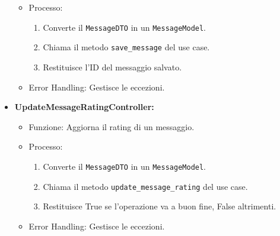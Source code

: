 \begin{itemize}
\begin{itemize}
            \item Processo:
            \begin{enumerate}
                \item Converte il \texttt{MessageDTO} in un \texttt{MessageModel}.
                \item Chiama il metodo \texttt{save\_message} del use case.
                \item Restituisce l’ID del messaggio salvato.
            \end{enumerate}
            \item Error Handling: Gestisce le eccezioni.
        \end{itemize}
        \item \textbf{UpdateMessageRatingController:}
        \begin{itemize}
            \item Funzione: Aggiorna il rating di un messaggio.
            \item Processo:
            \begin{enumerate}
                \item Converte il \texttt{MessageDTO} in un \texttt{MessageModel}.
                \item Chiama il metodo \texttt{update\_message\_rating} del use case.
                \item Restituisce True se l'operazione va a buon fine, False altrimenti.
            \end{enumerate}
            \item Error Handling: Gestisce le eccezioni.
        \end{itemize}
    \end{itemize}


